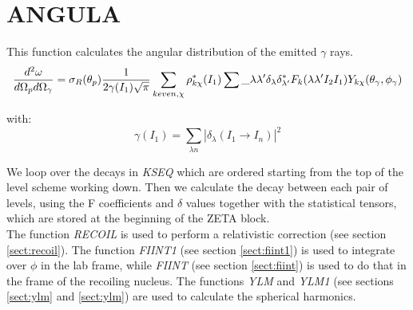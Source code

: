 \section{ANGULA}
\label{sect:angula}

\noindent This function calculates the angular distribution of the emitted
$\gamma$ rays.\\

\begin{equation}
{d^2\omega \over d\Omega_p d\Omega_\gamma} =
\sigma_R(\theta_p)
{1 \over 2\gamma(I_1) \sqrt{\pi}}
\sum_{k even, \chi}
\rho_{k\chi}^*(I_1)
\sum\_{\lambda\lambda^\prime}
\delta_\lambda
\delta_{\lambda^\prime}^*
F_k(\lambda \lambda^\prime I_2 I_1)
Y_{k\chi}(\theta_\gamma, \phi_\gamma)
\end{equation}

\noindent with:\\

\begin{equation}
\gamma(I_1) = \sum_{\lambda n} |\delta_\lambda(I_1 \rightarrow I_n)|^2
\end{equation}

\noindent We loop over the decays in {\em KSEQ} which are ordered
starting from the top of the level scheme working down. Then we calculate
the decay between each pair of levels, using the F coefficients and $\delta$
values together with the statistical tensors, which are stored at the
beginning of the ZETA block.\\


\noindent The function {\em RECOIL} is used to perform a relativistic
correction (see section \ref{sect:recoil}). The function {\em FIINT1} (see
section \ref{sect:fiint1}) is used to integrate over $\phi$ in the lab
frame, while {\em FIINT} (see section \ref{sect:fiint}) is used to do that
in the frame of the recoiling nucleus. The functions {\em YLM} and {\em
YLM1} (see sections \ref{sect:ylm} and \ref{sect:ylm}) are used to calculate
the spherical harmonics.\\

